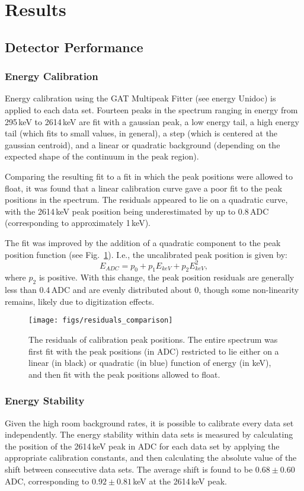 \documentclass[groupedaddress,rmp,amsmath,amssymb,bibnotes,altaffilletter,twocolumn]{revtex4-1}
\begin{document}
\section{Results}
\subsection{Detector Performance}
\subsubsection{Energy Calibration}
Energy calibration using the GAT Multipeak Fitter (see energy Unidoc) is applied to each data set. Fourteen peaks in the spectrum ranging in energy from 295\,keV to 2614\,keV are fit with a gaussian peak, a low energy tail, a high energy tail (which fits to small values, in general), a step (which is centered at the gaussian centroid), and a linear or quadratic background (depending on the expected shape of the continuum in the peak region).

Comparing the resulting fit to a fit in which the peak positions were allowed to float, it was found that a linear calibration curve gave a poor fit to the peak positions in the spectrum. The residuals appeared to lie on a quadratic curve, with the 2614\,keV peak position being underestimated by up to 0.8\,ADC (corresponding to approximately 1\,keV). 

The fit was improved by the addition of a quadratic component to the peak position function (see Fig.~\ref{fig:calib_residuals}). I.e., the uncalibrated peak position is given by:
$$E_{ADC} = p_0 + p_1E_{keV} + p_2E_{keV}^2,$$
where $p_2$ is positive. With this change, the peak position residuals are generally less than 0.4\,ADC and are evenly distributed about 0, though some non-linearity remains, likely due to digitization effects. 

\begin{figure}[]
 \centering
 \texttt{[image: figs/residuals\_comparison]}
 \caption{The residuals of calibration peak positions. The entire spectrum was first fit with the peak positions (in ADC) restricted to lie either on a linear (in black) or quadratic (in blue) function of energy (in keV), and then fit with the peak positions allowed to float.} 
 \label{fig:calib_residuals}
\end{figure}
\subsubsection{Energy Stability}
Given the high room background rates, it is possible to calibrate every data set independently. The energy stability within data sets is measured by calculating the position of the 2614\,keV peak in ADC for each data set by applying the appropriate calibration constants, and then calculating the absolute value of the shift between consecutive data sets. The average shift is found to be $0.68\pm0.60$\,ADC, corresponding to $0.92\pm0.81$\,keV at the 2614\,keV peak. 
\end{document}
